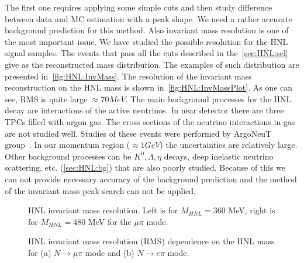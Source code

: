 \documentclass[../main.tex]{subfiles}
\begin{document}
The first one requires applying some simple cuts and then study difference between data and MC estimation with a peak shape. We need a rather accurate background prediction for this method. Also invariant mass resolution is one of the most important issue. We have studied the possible resolution for the HNL signal samples. The events that pass all the cuts described in the~\autoref{sec:HNL:sel} give as the reconstructed mass distribution. The examples of such distribution are presented in~\autoref{fig:HNL:InvMass}. The resolution of the invariant mass reconstruction on the HNL mass is shown in~\autoref{fig:HNL:InvMassPlot}. As one can see, RMS is quite large $\approx70MeV$. The main background processes for the HNL decay are  interactions of the active neutrinos. In near detector there are three TPCs filled with argon gas. The cross sections of the neutrino interactions in gas are not studied well. Studies of these events were performed by ArgoNeuT group~\cite{Acciarri2014}. In our momentum region ($\approx1GeV$) the uncertainties are relatively large. Other background processes can be $K^0, \Lambda, \eta$ decays, deep inelastic neutrino scattering, etc. (\autoref{sec:HNL:bg}) that are also poorly studied. Because of this we can not provide necessary accuracy of the background prediction and the method of the invariant mass peak search can not be applied.
\begin{figure}[!ht]
    \begin{minipage}[!ht]{0.49\linewidth}
    \end{minipage}
    \hfill
    \begin{minipage}[!ht]{0.49\linewidth}
    \end{minipage}
    \caption{HNL invariant mass resolution. Left is for $M_{HNL}=360$ MeV, right is for $M_{HNL}=480$ MeV for the $\mu\pi$ mode.}
    \label{fig:HNL:InvMass}
\end{figure}

\begin{figure}[!ht]
    \begin{minipage}[!ht]{0.49\linewidth}
    \end{minipage}
    \hfill
    \begin{minipage}[!ht]{0.49\linewidth}
    \end{minipage}
    \caption{HNL invariant mass resolution (RMS) dependence on the HNL mass for (a) $N\to \mu\pi$ mode and (b) $N\to e\pi$ mode.}
    \label{fig:HNL:InvMassPlot}
\end{figure}
\end{document}
